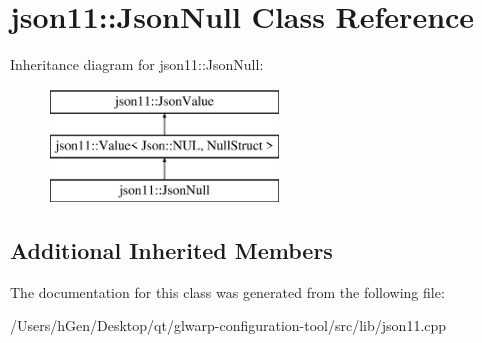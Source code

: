 \hypertarget{classjson11_1_1_json_null}{}\section{json11\+:\+:Json\+Null Class Reference}
\label{classjson11_1_1_json_null}
Inheritance diagram for json11\+:\+:Json\+Null\+:\begin{figure}[H]
\begin{center}
\leavevmode
\includegraphics[height=3.000000cm]{classjson11_1_1_json_null}
\end{center}
\end{figure}
\subsection*{Additional Inherited Members}


The documentation for this class was generated from the following file\+:\begin{DoxyCompactItemize}
\item 
/\+Users/h\+Gen/\+Desktop/qt/glwarp-\/configuration-\/tool/src/lib/json11.\+cpp\end{DoxyCompactItemize}
